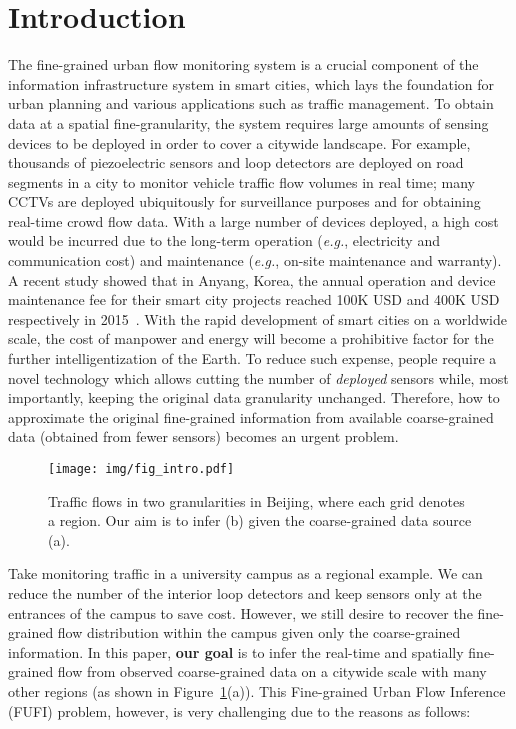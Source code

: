\section{Introduction}
The fine-grained urban flow monitoring system is a crucial component of the information infrastructure system in smart cities, which lays the foundation for urban planning and various applications such as traffic management. To obtain data at a spatial fine-granularity, the system requires large amounts of sensing devices to be deployed in order to cover a citywide landscape. For example, thousands of piezoelectric sensors and loop detectors are deployed on road segments in a city to monitor vehicle traffic flow volumes in real time; many CCTVs are deployed ubiquitously for surveillance purposes and for obtaining real-time crowd flow data. With a large number of devices deployed, a high cost would be incurred due to the long-term operation (\textit{e.g.}, electricity and communication cost) and maintenance (\textit{e.g.}, on-site maintenance and warranty). A recent study showed that in Anyang, Korea, the annual operation and device maintenance fee for their smart city projects reached 100K USD and 400K USD respectively in 2015~\cite{idb-korea}. With the rapid development of smart cities on a worldwide scale, the cost of manpower and energy will become a prohibitive factor for the further intelligentization of the Earth. To reduce such expense, people require a novel technology which allows cutting the number of \textit{deployed} sensors while, most importantly, keeping the original data granularity unchanged. Therefore, how to approximate the original fine-grained information from available coarse-grained data (obtained from fewer sensors) becomes an urgent problem.
\begin{figure}[!h]
	\centering
	\texttt{[image: img/fig\_intro.pdf]}
	\vspace{-1em}
	\caption{\label{fig:intro} Traffic flows in two granularities in Beijing, where each grid denotes a region. Our aim is to infer (b) given the coarse-grained data source (a).}	
	\vspace{-1em}
\end{figure}

Take monitoring traffic in a university campus as a regional example. We can reduce the number of the interior loop detectors and keep sensors only at the entrances of the campus to save cost. However, we still desire to recover the fine-grained flow distribution within the campus given only the coarse-grained information. In this paper, \textbf{our goal} is to infer the real-time and spatially fine-grained flow from observed coarse-grained data on a citywide scale with many other regions (as shown in Figure~\ref{fig:intro}(a)). This Fine-grained Urban Flow Inference (FUFI) problem, however, is very challenging due to the reasons as follows:

